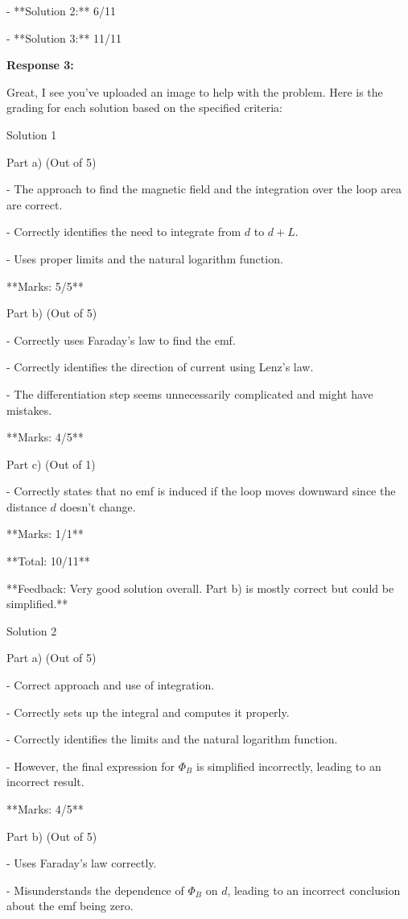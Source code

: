 \documentclass[a4paper,11pt]{article}
\begin{document}
- **Solution 2:** 6/11

- **Solution 3:** 11/11

\bigskip 
\textbf{Response 3:}

Great, I see you’ve uploaded an image to help with the problem. Here is the grading for each solution based on the specified criteria:

Solution 1

Part a) (Out of 5)

- The approach to find the magnetic field and the integration over the loop area are correct.

- Correctly identifies the need to integrate from \(d\) to \(d+L\).

- Uses proper limits and the natural logarithm function.

**Marks: 5/5**

Part b) (Out of 5)

- Correctly uses Faraday's law to find the emf.

- Correctly identifies the direction of current using Lenz's law.

- The differentiation step seems unnecessarily complicated and might have mistakes.

**Marks: 4/5**

Part c) (Out of 1)

- Correctly states that no emf is induced if the loop moves downward since the distance \(d\) doesn't change.

**Marks: 1/1**

**Total: 10/11**

**Feedback: Very good solution overall. Part b) is mostly correct but could be simplified.**

Solution 2

Part a) (Out of 5)

- Correct approach and use of integration.

- Correctly sets up the integral and computes it properly.

- Correctly identifies the limits and the natural logarithm function.

- However, the final expression for \(\Phi_B\) is simplified incorrectly, leading to an incorrect result.

**Marks: 4/5**

Part b) (Out of 5)

- Uses Faraday's law correctly.

- Misunderstands the dependence of \(\Phi_B\) on \(d\), leading to an incorrect conclusion about the emf being zero.
\end{document}
